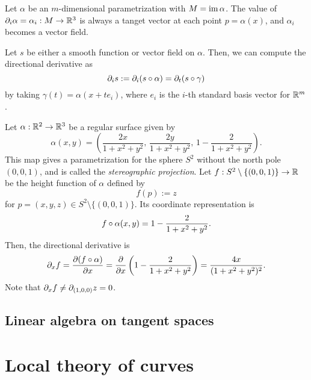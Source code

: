 \documentclass{../exp}
\def\a{\alpha}
\begin{document}
\begin{exs} %
\item
Let $\a$ be an $m$-dimensional parametrization with $M=\im\a$.
The value of $\pd_i\a=\a_i:M\to\R^3$ is always a tanget vector at each point $p=\a(x)$, and $\a_i$ becomes a vector field.

Let $s$ be either a smooth function or vector field on $\a$.
Then, we can compute the directional derivative as
\[\pd_is:=\pd_i(s\o\a)=\pd_t(s\o\gamma)\]
by taking $\gamma(t)=\a(x+te_i)$, where $e_i$ is the $i$-th standard basis vector for $\mathbb{R}^m$.

\item
Let $\a:\R^2\to\R^3$ be a regular surface given by
\[\a(x,y)=\left(\frac{2x}{1+x^2+y^2},\,\frac{2y}{1+x^2+y^2},\,1-\frac2{1+x^2+y^2}\right).\]
This map gives a parametrization for the sphere $S^2$ without the north pole $(0,0,1)$, and is called the \emph{stereographic projection}.
Let $f:S^2\setminus\{(0,0,1)\}\to\R$ be the height function of $\a$ defined by
\[f(p):=z\]
for $p=(x,y,z)\in S^2\setminus\{(0,0,1)\}$.
Its coordinate representation is
\[f\o\a(x,y)=1-\frac2{1+x^2+y^2}.\]
Then, the directional derivative is
\[\pd_xf=\pd{(f\o\a)}{x}=\pd{x}\left(1-\frac2{1+x^2+y^2}\right)=\frac{4x}{(1+x^2+y^2)^2}.\]
Note that $\pd_xf\ne\pd_{(1,0,0)}z=0$.
\end{exs}


\subsection{Linear algebra on tangent spaces}






























\section{Local theory of curves}
\end{document}

